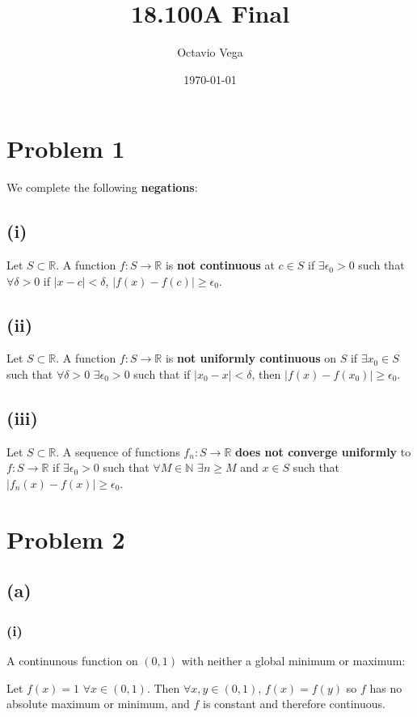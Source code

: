\documentclass{article}
\title{18.100A Final}
\author{Octavio Vega}
\date\today
\newcommand{\R}{\mathbb{R}} %
\newcommand{\N}{\mathbb{N}} %
\begin{document}
\maketitle
	
\section*{Problem 1}
We complete the following \textbf{negations}:
\subsection*{(i)}
Let $S \subset \R$. A function $f: S \to \R$ is \textbf{not continuous} at $c \in S$ if $\exists \epsilon_0 > 0$ such that $\forall \delta > 0$ if $|x - c| < \delta$, $|f(x) - f(c)| \geq \epsilon_0$.

\subsection*{(ii)}
Let $S \subset \R$. A function $f: S \to \R$ is \textbf{not uniformly continuous} on $S$ if $\exists x_0 \in S$ such that $\forall \delta > 0$ $\exists \epsilon_0 > 0$ such that if $|x_0 - x| < \delta$, then $|f(x) - f(x_0)| \geq \epsilon_0$.

\subsection*{(iii)}
Let $S \subset \R$. A sequence of functions $f_n: S \to \R$ \textbf{does not converge uniformly} to $f: S \to \R$ if $\exists \epsilon_0 > 0$ such that $\forall M \in \N$ $\exists n \geq M$ and $x \in S$ such that $|f_n(x) - f(x)| \geq \epsilon_0$.
\section*{Problem 2}
\subsection*{(a)}
\subsubsection*{(i)}
A continunous function on $(0, 1)$ with neither a global minimum or maximum:

Let $f(x) = 1$ $\forall x \in (0, 1)$. Then $\forall x, y \in (0, 1)$, $f(x) = f(y)$ so $f$ has no absolute maximum or minimum, and $f$ is constant and therefore continuous.
\end{document}

